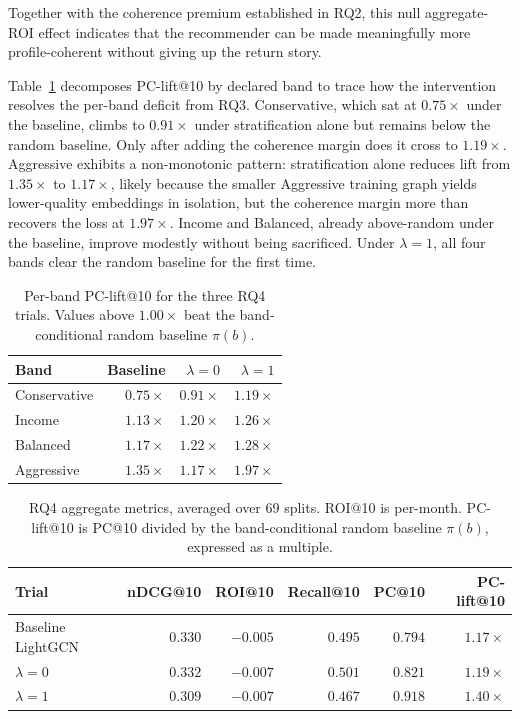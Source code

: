 Together with the coherence premium established in RQ2, this null aggregate-ROI effect indicates that the recommender can be made meaningfully more profile-coherent without giving up the return story.

Table~\ref{tab:rq4-per-band} decomposes PC-lift@10 by declared band to trace how the intervention resolves the per-band deficit from RQ3. Conservative, which sat at $0.75\times$ under the baseline, climbs to $0.91\times$ under stratification alone but remains below the random baseline. Only after adding the coherence margin does it cross to $1.19\times$. Aggressive exhibits a non-monotonic pattern: stratification alone reduces lift from $1.35\times$ to $1.17\times$, likely because the smaller Aggressive training graph yields lower-quality embeddings in isolation, but the coherence margin more than recovers the loss at $1.97\times$. Income and Balanced, already above-random under the baseline, improve modestly without being sacrificed. Under $\lambda = 1$, all four bands clear the random baseline for the first time.

\begin{table}[H]
\centering
\small
\begin{tabular}{lrrr}
\toprule
Band & Baseline & $\lambda = 0$ & $\lambda = 1$ \\
\midrule
Conservative & $0.75\times$ & $0.91\times$ & $1.19\times$ \\
Income       & $1.13\times$ & $1.20\times$ & $1.26\times$ \\
Balanced     & $1.17\times$ & $1.22\times$ & $1.28\times$ \\
Aggressive   & $1.35\times$ & $1.17\times$ & $1.97\times$ \\
\bottomrule
\end{tabular}
\caption{Per-band PC-lift@10 for the three RQ4 trials. Values above $1.00\times$ beat the band-conditional random baseline $\pi(b)$.}
\label{tab:rq4-per-band}
\end{table}

\begin{table}[!t]
\centering
\small
\begin{tabular}{lrrrrr}
\toprule
Trial & nDCG@10 & ROI@10 & Recall@10 & PC@10 & PC-lift@10 \\
\midrule
Baseline LightGCN      & $0.330$ & $-0.005$ & $0.495$ & $0.794$ & $1.17\times$ \\
$\lambda = 0$ & $0.332$ & $-0.007$ & $0.501$ & $0.821$ & $1.19\times$ \\
$\lambda = 1$ & $0.309$ & $-0.007$ & $0.467$ & $0.918$ & $1.40\times$ \\
\bottomrule
\end{tabular}
\caption{RQ4 aggregate metrics, averaged over 69 splits. ROI@10 is per-month. PC-lift@10 is PC@10 divided by the band-conditional random baseline $\pi(b)$, expressed as a multiple.}
\label{tab:rq4-aggregate}
\end{table}

